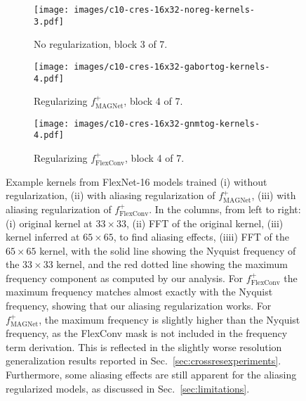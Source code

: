 \documentclass{article} \usepackage{iclr2022_conference,times}
\begin{document}
\begin{figure}
    \centering
\begin{subfigure}[c]{0.98\textwidth}
     \vspace{2.5mm}
         \centering
         \texttt{[image: images/c10-cres-16x32-noreg-kernels-3.pdf]}
\label{fig:c10-cres-noreg-kernels-1}
         \vspace{-3mm}
         \caption{No regularization, block 3 of 7.}
     \end{subfigure}
\begin{subfigure}[c]{0.98\textwidth}
     \vspace{2.5mm}
         \centering
         \texttt{[image: images/c10-cres-16x32-gabortog-kernels-4.pdf]}
\label{fig:c10-cres-gabor-kernels-1}
         \vspace{-3mm}
         \caption{Regularizing $f^+_{\textrm{MAGNet}}$, block 4 of 7.}
     \end{subfigure}
\begin{subfigure}[c]{0.98\textwidth}
     \vspace{2.5mm}
         \centering
         \texttt{[image: images/c10-cres-16x32-gnmtog-kernels-4.pdf]}
         \label{fig:c10-cres-gabor-kernels-1}
         \vspace{-3mm}
         \caption{Regularizing $f^+_{\textrm{FlexConv}}$, block 4 of 7.}
     \end{subfigure}
    \caption{Example kernels from FlexNet-16 models trained (i) without regularization, (ii) with aliasing regularization of $f^+_{\textrm{MAGNet}}$, (iii) with aliasing regularization of $f^+_{\textrm{FlexConv}}$. In the columns, from left to right: (i) original kernel at $33 \times 33$, (ii) FFT of the original kernel, (iii) kernel inferred at $65 \times 65$, to find aliasing effects, (iiii) FFT of the $65 \times 65$ kernel, with the solid line showing the Nyquist frequency of the $33 \times 33$ kernel, and the red dotted line showing the maximum frequency component as computed by our analysis. For $f^+_{\textrm{FlexConv}}$ the maximum frequency matches almost exactly with the Nyquist frequency, showing that our aliasing regularization works. For $f^+_{\textrm{MAGNet}}$, the maximum frequency is slightly higher than the Nyquist frequency, as the FlexConv mask is not included in the frequency term derivation. This is reflected in the slightly worse resolution generalization results reported in Sec.~\ref{sec:crossresexperiments}. Furthermore, some aliasing effects are still apparent for the aliasing regularized models, as discussed in Sec.~\ref{sec:limitations}.
    \vspace{-2mm}}
    \label{fig:app-cifar10kernelfrequencies}
\end{figure}
\end{document}
